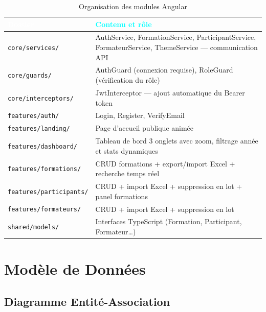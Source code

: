 \documentclass[12pt,a4paper]{report}
\begin{document}
\begin{table}[H]
\centering
\caption{Organisation des modules Angular}
\small
\begin{tabularx}{\textwidth}{|L{4.2cm}|X|}
\hline
{} \textcolor{white}{\textbf{Dossier}} & \textcolor{cyan}{\textbf{Contenu et r\^{o}le}} \\
\hline
\texttt{core/services/} & AuthService, FormationService, ParticipantService, FormateurService, ThemeService --- communication API \\
\hline
\texttt{core/guards/} & AuthGuard (connexion requise), RoleGuard (v\'{e}rification du r\^{o}le) \\
\hline
\texttt{core/interceptors/} & JwtInterceptor --- ajout automatique du Bearer token \\
\hline
\texttt{features/auth/} & Login, Register, VerifyEmail \\
\hline
\texttt{features/landing/} & Page d'accueil publique anim\'{e}e \\
\hline
\texttt{features/dashboard/} & Tableau de bord 3 onglets avec zoom, filtrage ann\'{e}e et stats dynamiques \\
\hline
\texttt{features/formations/} & CRUD formations + export/import Excel + recherche temps r\'{e}el \\
\hline
\texttt{features/participants/} & CRUD + import Excel + suppression en lot + panel formations \\
\hline
\texttt{features/formateurs/} & CRUD + import Excel + suppression en lot \\
\hline
\texttt{shared/models/} & Interfaces TypeScript (Formation, Participant, Formateur\ldots) \\
\hline
\end{tabularx}
\end{table}

\clearpage
\chapter{Mod\`{e}le de Donn\'{e}es}

\section{Diagramme Entit\'{e}-Association}
\end{document}
